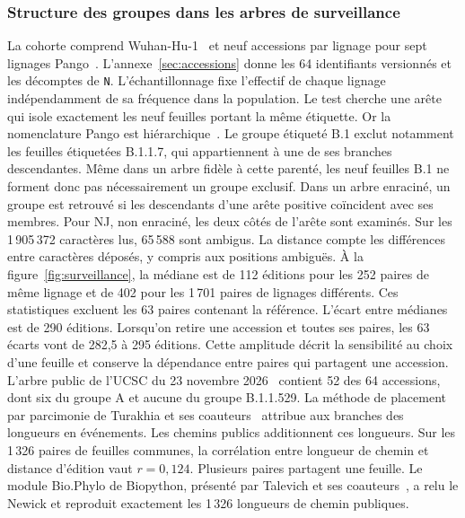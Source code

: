 \subsubsection{Structure des groupes dans les arbres de surveillance}
La cohorte comprend Wuhan-Hu-1~\cite{wuhanref} et neuf accessions par lignage pour sept lignages Pango~\cite{pango}. L’annexe~\ref{sec:accessions} donne les 64 identifiants versionnés et les décomptes de \texttt{N}. L’échantillonnage fixe l’effectif de chaque lignage indépendamment de sa fréquence dans la population. Le test cherche une arête qui isole exactement les neuf feuilles portant la même étiquette. Or la nomenclature Pango est hiérarchique~\cite{pango}. Le groupe étiqueté B.1 exclut notamment les feuilles étiquetées B.1.1.7, qui appartiennent à une de ses branches descendantes. Même dans un arbre fidèle à cette parenté, les neuf feuilles B.1 ne forment donc pas nécessairement un groupe exclusif. Dans un arbre enraciné, un groupe est retrouvé si les descendants d'une arête positive coïncident avec ses membres. Pour NJ, non enraciné, les deux côtés de l'arête sont examinés. Sur les 1\,905\,372 caractères lus, 65\,588 sont ambigus. La distance compte les différences entre caractères déposés, y compris aux positions ambiguës.
À la figure~\ref{fig:surveillance}, la médiane est de 112 éditions pour les 252 paires de même lignage et de 402 pour les 1\,701 paires de lignages différents. Ces statistiques excluent les 63 paires contenant la référence. L'écart entre médianes est de 290 éditions. Lorsqu'on retire une accession et toutes ses paires, les 63 écarts vont de 282,5 à 295 éditions. Cette amplitude décrit la sensibilité au choix d'une feuille et conserve la dépendance entre paires qui partagent une accession. L’arbre public de l’UCSC du 23 novembre 2026~\cite{ushertree} contient 52 des 64 accessions, dont six du groupe A et aucune du groupe B.1.1.529. La méthode de placement par parcimonie de Turakhia et ses coauteurs~\cite{usher} attribue aux branches des longueurs en événements. Les chemins publics additionnent ces longueurs. Sur les 1\,326 paires de feuilles communes, la corrélation entre longueur de chemin et distance d’édition vaut \(r=0{,}124\). Plusieurs paires partagent une feuille. Le module Bio.Phylo de Biopython, présenté par Talevich et ses coauteurs~\cite{biophylo}, a relu le Newick et reproduit exactement les 1\,326 longueurs de chemin publiques.

